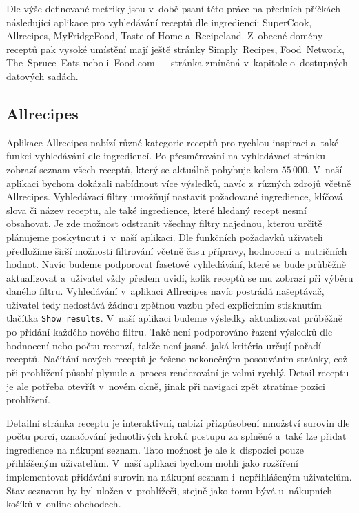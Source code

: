 Dle výše definované metriky jsou v~době psaní této práce na předních příčkách následující aplikace pro vyhledávání receptů dle ingrediencí: SuperCook, Allrecipes, MyFridgeFood, Taste of Home a~Recipeland. Z~obecné domény receptů pak vysoké umístění mají ještě stránky Simply~Recipes, Food~Network, The~Spruce~Eats nebo i~Food.com --- stránka zmíněná v~kapitole o~dostupných datových sadách.

\subsection{Allrecipes}

Aplikace Allrecipes nabízí různé kategorie receptů pro rychlou inspiraci a~také funkci vyhledávání dle ingrediencí. Po přesměrování na vyhledávací stránku zobrazí seznam všech receptů, který se aktuálně pohybuje kolem $55\,000$. V~naší aplikaci bychom dokázali nabídnout více výsledků, navíc z~různých zdrojů včetně Allrecipes. Vyhledávací filtry umožňují nastavit požadované ingredience, klíčová slova či název receptu, ale také ingredience, které hledaný recept nesmí obsahovat. Je zde možnost odstranit všechny filtry najednou, kterou určitě plánujeme poskytnout i~v~naší aplikaci. Dle funkčních požadavků uživateli předložíme širší možnosti filtrování včetně času přípravy, hodnocení a~nutričních hodnot. Navíc budeme podporovat fasetové vyhledávání, které se bude průběžně aktualizovat a~uživatel vždy předem uvidí, kolik receptů se mu zobrazí při výběru daného filtru. Vyhledávání v~aplikaci Allrecipes navíc postrádá našeptávač, uživatel tedy nedostává žádnou zpětnou vazbu před explicitním stisknutím tlačítka \texttt{Show results}. V~naší aplikaci budeme výsledky aktualizovat průběžně po přidání každého nového filtru. Také není podporováno řazení výsledků dle hodnocení nebo počtu recenzí, takže není jasné, jaká kritéria určují pořadí receptů. Načítání nových receptů je řešeno nekonečným posouváním stránky, což při prohlížení působí plynule a~proces renderování je velmi rychlý. Detail receptu je ale potřeba otevřít v~novém okně, jinak při navigaci zpět ztratíme pozici prohlížení.

Detailní stránka receptu je interaktivní, nabízí přizpůsobení množství surovin dle počtu porcí, označování jednotlivých kroků postupu za splněné a~také lze přidat ingredience na nákupní seznam. Tato možnost je ale k~dispozici pouze přihlášeným uživatelům. V~naší aplikaci bychom mohli jako rozšíření implementovat přidávání surovin na nákupní seznam i~nepřihlášeným uživatelům. Stav seznamu by byl uložen v~prohlížeči, stejně jako tomu bývá u~nákupních košíků v~online obchodech.

